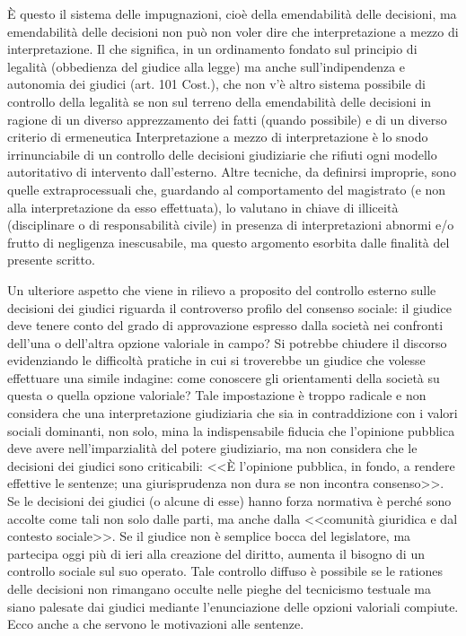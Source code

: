 È questo il sistema delle impugnazioni, cioè della emendabilità delle decisioni, ma emendabilità delle decisioni non può non voler dire che interpretazione a mezzo di interpretazione. Il che significa, in un ordinamento fondato sul principio di legalità (obbedienza del giudice alla legge) ma anche sull'indipendenza e autonomia dei giudici (art. 101 Cost.), che non v'è altro sistema possibile di controllo della legalità se non sul terreno della emendabilità delle decisioni in ragione di un diverso apprezzamento dei fatti (quando possibile) e di un diverso criterio di ermeneutica Interpretazione a mezzo di interpretazione è lo snodo irrinunciabile di un controllo delle decisioni giudiziarie che rifiuti ogni modello autoritativo di intervento dall'esterno. Altre tecniche, da definirsi improprie, sono quelle extraprocessuali che, guardando al comportamento del magistrato (e non alla interpretazione da esso effettuata), lo valutano in chiave di illiceità (disciplinare o di responsabilità civile) in presenza di interpretazioni abnormi e/o frutto di negligenza inescusabile, ma questo argomento esorbita dalle finalità del presente scritto.

Un ulteriore aspetto che viene in rilievo a proposito del controllo esterno sulle decisioni dei giudici riguarda il controverso profilo del consenso sociale: il giudice deve tenere conto del grado di approvazione espresso dalla società nei confronti dell'una o dell'altra opzione valoriale in campo? Si potrebbe chiudere il discorso evidenziando le difficoltà pratiche in cui si troverebbe un giudice che volesse effettuare una simile indagine: come conoscere gli orientamenti della società su questa o quella opzione valoriale? Tale impostazione è troppo radicale e non considera che una interpretazione giudiziaria che sia in contraddizione con i valori sociali dominanti, non solo, mina la indispensabile fiducia che l'opinione pubblica deve avere nell'imparzialità del potere giudiziario, ma non considera che le decisioni dei giudici sono criticabili: <<È l'opinione pubblica, in fondo, a rendere effettive le sentenze; una giurisprudenza non dura se non incontra consenso>>.
Se le decisioni dei giudici (o alcune di esse) hanno forza normativa è perché sono accolte come tali non solo dalle parti, ma anche dalla <<comunità giuridica e dal contesto sociale>>. Se il giudice non è semplice bocca del legislatore, ma partecipa oggi più di ieri alla creazione del diritto, aumenta il bisogno di un controllo sociale sul suo operato. Tale controllo diffuso è possibile se le rationes delle decisioni non rimangano occulte nelle pieghe del tecnicismo testuale ma siano palesate dai giudici mediante l'enunciazione delle opzioni valoriali compiute.
Ecco anche a che servono le motivazioni alle sentenze. 


